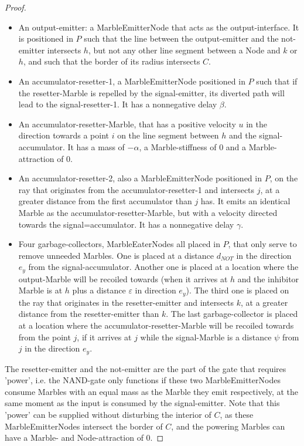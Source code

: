 \begin{proof}
\begin{itemize}
        \item An output-emitter: a MarbleEmitterNode that acts as the output-interface. It is positioned in $P$ such that the line between the output-emitter and the not-emitter intersects $h$, but not any other line segment between a Node and $k$ or $h$, and such that the border of its radius intersects $C$.
        
        \item An accumulator-resetter-1, a MarbleEmitterNode positioned in $P$ such that if the resetter-Marble is repelled by the signal-emitter, its diverted path will lead to the signal-resetter-1. It has a nonnegative delay $\beta$.
        
        \item An accumulator-resetter-Marble, that has a positive velocity $u$ in the direction towards a point $i$ on the line segment between $h$ and the signal-accumulator. It has a mass of $-\alpha$, a Marble-stiffness of 0 and a Marble-attraction of 0. 
        
        \item An accumulator-resetter-2, also a MarbleEmitterNode positioned in $P$, on the ray that originates from the accumulator-resetter-1 and intersects $j$, at a greater distance from the first accumulator than $j$ has. It emits an identical Marble as the accumulator-resetter-Marble, but with a velocity directed towards the signal=accumulator. It has a nonnegative delay $\gamma$.
        
        \item Four garbage-collectors, MarbleEaterNodes all placed in $P$, that only serve to remove unneeded Marbles. One is placed at a distance $d_{NOT}$ in the direction $e_y$ from the signal-accumulator. Another one is placed at a location where the output-Marble will be recoiled towards (when it arrives at $h$ and the inhibitor Marble is at $h$ plus a distance $\varepsilon$ in direction $e_y$). The third one is placed on the ray that originates in the resetter-emitter and intersects $k$, at a greater distance from the resetter-emitter than $k$. The last garbage-collector is placed at a location where the accumulator-resetter-Marble will be recoiled towards from the point $j$, if it arrives at $j$ while the signal-Marble is a distance $\psi$ from $j$ in the direction $e_y$. 
    \end{itemize}
    
    The resetter-emitter and the not-emitter are the part of the gate that requires 'power', i.e. the NAND-gate only functions if these two MarbleEmitterNodes consume Marbles with an equal mass as the Marble they emit respectively, at the same moment as the input is consumed by the signal-emitter. Note that this 'power' can be supplied without disturbing the interior of $C$, as these MarbleEmitterNodes intersect the border of $C$, and the powering Marbles can have a Marble- and Node-attraction of 0.
    

\end{proof}
